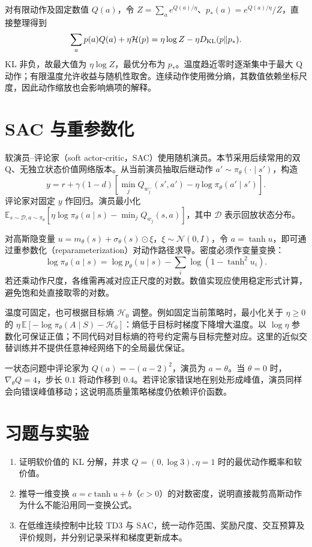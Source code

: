 \documentclass[UTF8,12pt,a4paper,fontset=fandol]{ctexbook}
\begin{document}
对有限动作及固定数值 $Q(a)$，令 $Z=\sum_a e^{Q(a)/\eta}$、$p_*(a)=e^{Q(a)/\eta}/Z$，直接整理得到
\[
\sum_a p(a)Q(a)+\eta\mathcal H(p)
=\eta\log Z-\eta D_{\rm KL}(p\|p_*).
\]
KL 非负，故最大值为 $\eta\log Z$，最优分布为 $p_*$。温度趋近零时逐渐集中于最大 Q 动作；有限温度允许收益与随机性取舍。连续动作使用微分熵，其数值依赖坐标尺度，因此动作缩放也会影响熵项的解释。

\section{SAC 与重参数化}

软演员--评论家（soft actor-critic，SAC）使用随机演员。本节采用后续常用的双 Q、无独立状态价值网络版本\cite{haarnoja-sac-applications}。从当前演员抽取后继动作 $a'\sim\pi_\theta(\cdot\mid s')$，构造
\[
y=r+\gamma(1-d)\left[\min_jQ_{w_j^-}(s',a')-\eta\log\pi_\theta(a'\mid s')\right].
\]
评论家对固定 $y$ 作回归。演员最小化 $\mathbb E_{s\sim\mathcal D,a\sim\pi_\theta}[\eta\log\pi_\theta(a\mid s)-\min_jQ_{w_j}(s,a)]$，其中 $\mathcal D$ 表示回放状态分布。

对高斯隐变量 $u=m_\theta(s)+\sigma_\theta(s)\odot\xi$，$\xi\sim\mathcal N(0,I)$，令 $a=\tanh u$，即可通过重参数化（reparameterization）对动作路径求导。密度必须作变量变换：
\[
\log\pi_\theta(a\mid s)=\log p_\theta(u\mid s)-\sum_i\log(1-\tanh^2u_i).
\]
若还乘动作尺度，各维需再减对应正尺度的对数。数值实现应使用稳定形式计算，避免饱和处直接取零的对数。

温度可固定，也可根据目标熵 $\mathcal H_0$ 调整。例如固定当前策略时，最小化关于 $\eta\geq0$ 的 $\eta\,\mathbb E[-\log\pi_\theta(A\mid S)-\mathcal H_0]$：熵低于目标时梯度下降增大温度。以 $\log\eta$ 参数化可保证正值；不同代码对目标熵的符号约定需与目标完整对应。这里的近似交替训练并不提供任意神经网络下的全局最优保证。

\begin{example}[连续动作的梯度方向]
一状态问题中评论家为 $Q(a)=-(a-2)^2$，演员为 $a=\theta$。当 $\theta=0$ 时，$\nabla_\theta Q=4$，步长 $0.1$ 将动作移到 $0.4$。若评论家错误地在别处形成峰值，演员同样会向错误峰值移动；这说明高质量策略梯度仍依赖评价函数。
\end{example}

\section{习题与实验}
\begin{enumerate}
\item 证明软价值的 KL 分解，并求 $Q=(0,\log3),\eta=1$ 时的最优动作概率和软价值。
\item 推导一维变换 $a=c\tanh u+b$（$c>0$）的对数密度，说明直接裁剪高斯动作为什么不能沿用同一变换公式。
\item 在低维连续控制中比较 TD3 与 SAC，统一动作范围、奖励尺度、交互预算及评价规则，并分别记录采样和梯度更新成本。
\end{enumerate}
\end{document}
